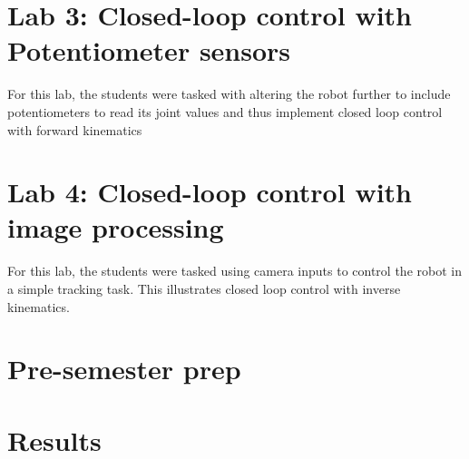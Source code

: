 
\section{Lab 3: Closed-loop control with Potentiometer sensors}

For this lab, the students were tasked with altering the robot further to include potentiometers to read its joint values and thus implement closed loop control with forward kinematics

\section{Lab  4: Closed-loop control with image processing}

For this lab, the students were tasked using camera inputs to control the robot in a simple tracking task. This illustrates closed loop control with inverse kinematics. 


\section{Pre-semester prep}



\section{Results}

